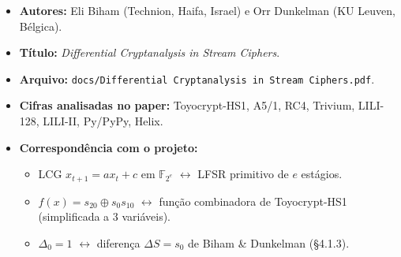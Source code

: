 \documentclass[12pt,a4paper]{article}
\theoremstyle{definition}
\theoremstyle{remark}
\newcommand{\GF}[1]{\mathbb{F}_{2^{#1}}}
\newcommand{\xor}{\oplus}
\newcommand{\filter}{f}
\begin{document}
\begin{itemize}
  \item \textbf{Autores:} Eli Biham (Technion, Haifa, Israel) e
        Orr Dunkelman (KU Leuven, Bélgica).
  \item \textbf{Título:} \textit{Differential Cryptanalysis in Stream Ciphers}.
  \item \textbf{Arquivo:} \texttt{docs/Differential Cryptanalysis in Stream Ciphers.pdf}.
  \item \textbf{Cifras analisadas no paper:} Toyocrypt-HS1, A5/1, RC4,
        Trivium, LILI-128, LILI-II, Py/PyPy, Helix.
  \item \textbf{Correspondência com o projeto:}
    \begin{itemize}
      \item LCG $x_{t+1} = ax_t + c$ em $\GF{e}$ $\leftrightarrow$ LFSR
            primitivo de $e$ estágios.
      \item $\filter(x) = s_{20} \xor s_0 s_{10}$ $\leftrightarrow$
            função combinadora de Toyocrypt-HS1 (simplificada a 3 variáveis).
      \item $\Delta_0 = 1$ $\leftrightarrow$ diferença $\Delta S = s_0$
            de Biham \& Dunkelman (\S4.1.3).
    \end{itemize}
\end{itemize}
\end{document}

